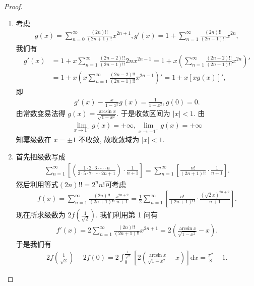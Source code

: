 \documentclass[../../main.tex]{subfiles}
\begin{document}
\begin{proof}
\begin{enumerate}
\item 考虑
\begin{align*}
g(x) = \sum_{n=0}^{\infty} \frac{(2n)!!}{(2n + 1)!!} x^{2n + 1}, g'(x) = 1 + \sum_{n=1}^{\infty} \frac{(2n)!!}{(2n - 1)!!} x^{2n},
\end{align*}
我们有
\begin{align*}
g'(x) &= 1 + x \sum_{n=1}^{\infty} \frac{(2n - 2)!!}{(2n - 1)!!} 2n x^{2n - 1} = 1 + x \left( \sum_{n=1}^{\infty} \frac{(2n - 2)!!}{(2n - 1)!!} x^{2n} \right)' \\
&= 1 + x \left( x \sum_{n=1}^{\infty} \frac{(2n - 2)!!}{(2n - 1)!!} x^{2n - 1} \right)' = 1 + x [x g(x)]',
\end{align*}
即
\begin{align*}
g'(x) - \frac{x}{1 - x^2} g(x) = \frac{1}{1 - x^2}, g(0) = 0.
\end{align*}
由常数变易法得 $g(x) = \frac{\arcsin x}{\sqrt{1 - x^2}}$. 于是收敛区间为 $|x| < 1$. 由
\begin{align*}
\lim_{x \to 1^-} g(x) = +\infty, \lim_{x \to -1^+} g(x) = +\infty
\end{align*}
知幂级数在 $x = \pm 1$ 不收敛, 故收敛域为 $|x| < 1$.
\item 首先把级数写成
\begin{align*}
\sum_{n=1}^{\infty} \left[ \left( \frac{1 \cdot 2 \cdot 3 \cdot \cdots \cdot n}{3 \cdot 5 \cdot 7 \cdot \cdots \cdot 2n + 1} \right) \cdot \frac{1}{n + 1} \right] = \sum_{n=1}^{\infty} \left[ \frac{n!}{(2n + 1)!!} \cdot \frac{1}{n + 1} \right].
\end{align*}
然后利用等式$(2n)!!=2^nn!$可考虑
\begin{align*}
f(x) = \sum_{n=1}^{\infty} \frac{(2n)!!}{(2n + 1)!!} \frac{x^{2n + 2}}{n + 1} = \frac{1}{2} \sum_{n=1}^{\infty} \left[ \frac{n!}{(2n + 1)!!} \cdot \frac{(\sqrt{2}x)^{2n + 2}}{n + 1} \right].
\end{align*}
现在所求级数为 $2f\left( \frac{1}{\sqrt{2}} \right)$.
我们利用第 1 问有
\begin{align*}
f'(x) = 2 \sum_{n=1}^{\infty} \frac{(2n)!!}{(2n + 1)!!} x^{2n + 1} = 2 \left( \frac{\arcsin x}{\sqrt{1 - x^2}} - x \right).
\end{align*}
于是我们有
\begin{align*}
2f\left( \frac{1}{\sqrt{2}} \right) - 2f(0) = 2 \int_0^{\frac{1}{\sqrt{2}}} \left[ 2 \left( \frac{\arcsin x}{\sqrt{1 - x^2}} - x \right) \right] \mathrm{d}x = \frac{\pi^2}{8} - 1.
\end{align*}
\end{enumerate}
\end{proof}
\end{document}
